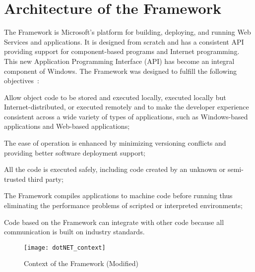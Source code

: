 \section{Architecture of the \dotNET Framework}
\label{sec:OverviewDotNetArchitecture}
The \dotNET Framework is Microsoft's platform for building, deploying, and running Web Services and applications. It is designed from scratch and has a consistent API providing support for component-based programs and Internet programming.
This new Application Programming Interface (API) has become an integral component of Windows. The \dotNET Framework was designed to fulfill the following objectives~\cite{Microsoft03-1}:

\begin{description}[noitemsep, style=nextline]
  \item[Consistency] Allow object code to be stored and executed locally, executed locally but Internet-distributed, or executed remotely and to make the developer experience consistent across a wide variety of types of applications, such as Windows-based applications and Web-based applications;
  \item[Operability] The ease of operation is enhanced by minimizing versioning conflicts and providing better software deployment support;
  \item[Security] All the code is executed safely, including code created by an unknown or semi-trusted third party;
  \item[Efficiency] The \dotNET Framework compiles applications to machine code before running thus eliminating the performance problems of scripted or interpreted environments;
  \item[Interoperability] Code based on the \dotNET Framework can integrate with other code because all communication is built on industry standards.
\end{description}

\begin{figure}
 \centering
 \texttt{[image: dotNET\_context]}
 \caption[Context of the \dotNET framework]{Context of the \dotNET Framework (Modified)~\cite{Microsoft03-1}}
 \label{fig:dotNET_context}
\end{figure}

